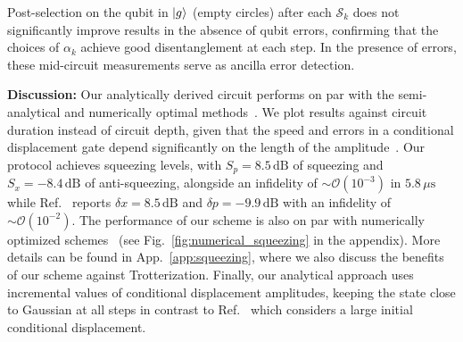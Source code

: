 \documentclass[aps,prx,showpacs,notitlepage,twocolumn,superscriptaddress,nofootinbib,preprintnumbers,floatfix,10pt, longbibliography]{revtex4-2}
\begin{document}
Post-selection on the qubit in $\ket{g}$ (empty circles) after each
$\mathcal{S}_k$ does not significantly improve results in the absence of
qubit errors, confirming that the choices of $\alpha_k$ achieve good
disentanglement at each step.  In the presence of errors, these mid-circuit
measurements serve as ancilla error detection.
\par\textbf{Discussion:} Our analytically derived circuit performs on par with the semi-analytical and numerically optimal methods~\cite{hastrup2021unconditional,eickbusch2022fast}. We plot results against circuit duration instead of circuit depth, given that the speed and errors in a conditional displacement gate depend significantly on the length of the amplitude~\cite{eickbusch2022fast}. Our protocol achieves squeezing levels, with $S_p=8.5 \, \mathrm{dB}$ of squeezing and $S_x=-8.4 \, \mathrm{dB}$ of anti-squeezing, alongside an infidelity of $\sim \mathcal{O}(10^{-3})$ in $5.8\,\mu\mathrm{s}$ while Ref.~\cite{hastrup2021unconditional} reports $\delta x=8.5\, \textrm{dB}$ and $\delta p=-9.9\, \textrm{dB}$ with an infidelity of $\sim \mathcal{O}(10^{-2})$. The performance of our scheme is also on par with numerically optimized schemes~\cite{eickbusch2022fast} (see Fig.~\ref{fig:numerical_squeezing} in the appendix). More details can be found in App.~\ref{app:squeezing}, where we also discuss the benefits of our scheme against Trotterization. Finally, our analytical approach uses incremental values of conditional displacement amplitudes, keeping the state close to Gaussian at all steps in contrast to Ref.~\cite{hastrup2021unconditional} which considers a large initial conditional displacement.

\end{document}

